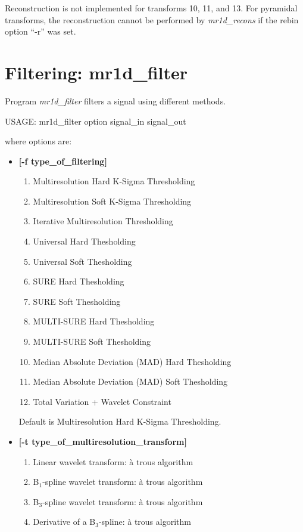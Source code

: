 Reconstruction is not implemented for transforms 10, 11, and 13. 
For pyramidal transforms,
the reconstruction cannot be performed by {\em mr1d\_recons} if 
the rebin option ``-r'' was set.


\section{Filtering: mr1d\_filter}
Program {\em mr1d\_filter} filters a signal using different methods. 
{\bf
\begin{center}
 USAGE: mr1d\_filter option signal\_in signal\_out
\end{center}}
where options are:
\begin{itemize}
\baselineskip=0.4truecm
\itemsep=0.1truecm
\item {\bf [-f type\_of\_filtering]} 
\begin{enumerate}
\baselineskip=0.4truecm
\itemsep=0.1truecm
\item  Multiresolution Hard K-Sigma Thresholding 
\item Multiresolution Soft K-Sigma Thresholding 
\item Iterative Multiresolution Thresholding 
\item Universal Hard Thesholding 
\item Universal Soft Thesholding 
\item SURE Hard Thesholding 
\item SURE Soft Thesholding 
\item MULTI-SURE Hard Thesholding 
\item MULTI-SURE Soft Thesholding 
\item Median Absolute Deviation (MAD) Hard Thesholding 
\item Median Absolute Deviation (MAD) Soft Thesholding 
\item Total Variation + Wavelet Constraint 
\end{enumerate}
Default is Multiresolution Hard K-Sigma Thresholding.
\item {\bf [-t type\_of\_multiresolution\_transform]} 
\begin{enumerate}
\baselineskip=0.4truecm
\itemsep=0.1truecm
\item Linear wavelet transform: \`a trous algorithm 
\item B$_1$-spline wavelet transform: \`a trous algorithm 
\item B$_3$-spline wavelet transform: \`a trous algorithm 
\item Derivative of a B$_3$-spline: \`a trous algorithm 

\end{enumerate}
\end{itemize}
